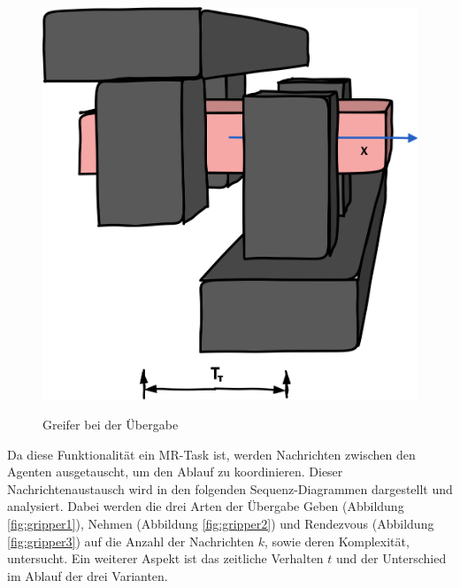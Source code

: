 \begin{figure}
{ 		\includegraphics[scale=0.45]{fig/grip3}
 		\label{fig:grip3}}
 	
 	\caption{Greifer bei der Übergabe}
 	\label{fig:grip}
 \end{figure}

Da diese Funktionalität ein MR-Task ist, werden Nachrichten zwischen den Agenten ausgetauscht, um den Ablauf zu koordinieren. Dieser Nachrichtenaustausch wird in den folgenden Sequenz-Diagrammen dargestellt und analysiert. Dabei werden die drei Arten der Übergabe Geben (Abbildung \ref{fig:gripper1}), Nehmen (Abbildung \ref{fig:gripper2}) und Rendezvous (Abbildung \ref{fig:gripper3}) auf die Anzahl der Nachrichten $k$, sowie deren Komplexität, untersucht. Ein weiterer Aspekt ist das zeitliche Verhalten $t$ und der Unterschied im Ablauf der drei Varianten.

